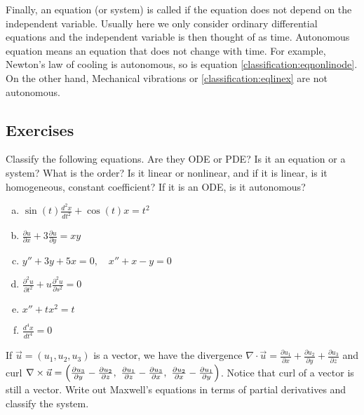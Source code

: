 \medskip

Finally, an equation (or system) is called \emph{}
if the equation does not depend on the independent variable.
Usually here we only consider ordinary differential equations and the
independent variable is then thought of as time.  Autonomous equation
means an equation that does not change with time.
For example, Newton's law of cooling is autonomous, so is equation
\eqref{classification:eqnonlinode}.  On the other hand, Mechanical
vibrations or 
\eqref{classification:eqlinex} are not autonomous.

\subsection{Exercises}

\begin{exercise}
Classify the following equations.  Are they ODE or PDE?  Is it an equation
or a system?  What is the order?  Is it linear or nonlinear, and if it is
linear, is it homogeneous, constant coefficient?  If it is an ODE\@, is it
autonomous?
\begin{enumerate}[a)]
\item $\displaystyle \sin(t) \frac{d^2 x}{dt^2} + \cos(t) x = t^2$
\item $\displaystyle \frac{\partial u}{\partial x} + 3 \frac{\partial u}{\partial y} = xy$
\item $\displaystyle y''+3y+5x=0, \quad x''+x-y=0$
\item $\displaystyle \frac{\partial^2 u}{\partial t^2} + u\frac{\partial^2 u}{\partial s^2} =
0$
\item $\displaystyle x''+tx^2=t$
\item $\displaystyle \frac{d^4 x}{dt^4} = 0$
\end{enumerate}
\end{exercise}

\begin{exercise}
If $\vec{u} = (u_1,u_2,u_3)$ is a vector, we have the divergence
$\nabla \cdot \vec{u} =
\frac{\partial u_1}{\partial x} +
\frac{\partial u_2}{\partial y} +
\frac{\partial u_3}{\partial z}$ and curl
$\nabla \times \vec{u} =
\Bigl(
\frac{\partial u_3}{\partial y} - \frac{\partial u_2}{\partial z} , ~
\frac{\partial u_1}{\partial z} - \frac{\partial u_3}{\partial x} , ~
\frac{\partial u_2}{\partial x} - \frac{\partial u_1}{\partial y} \Bigr)$.
Notice that curl of a vector is still a vector.  Write out Maxwell's
equations in terms of partial derivatives and classify the system.
\end{exercise}

